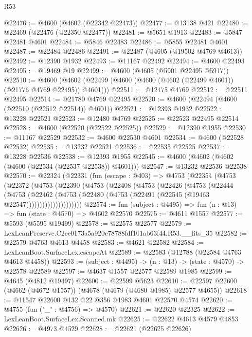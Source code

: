 \begin{lexlean}{R53}
\begin{coremodule}
@22476 := @4600 (@4602 (@22342 @22473))
@22477 := @13138 @421
@22480 := @22469 (@22476 (@22350 @22477))
@22481 := @5651 @1913
@22483 := @5847 @22481 @4601
@22484 := @5846 @22483
@22486 := @5855 @22481 @4601
@22487 := @22484 @22486
@22491 := @22487 (@4605 (@19502 @4769 @4613))
@22492 := @12390 @1932
@22493 := @11167 @22492
@22494 := @4600 @22493
@22495 := @19469 @19
@22499 := @4600 (@4605 (@5901 @22495 @5917))
@22510 := @4600 (@4602 (@22499 (@4600 (@4600 (@4602 (@22499 @4601)) (@21776 @4769 @22495)) @4601)))
@22511 := @12475 @4769
@22512 := @22511 @22495
@22514 := @21780 @4769 @22495
@22520 := @4600 (@22494 (@4600 (@22510 (@22512 @22514)) @4601))
@22521 := @12393 @1932
@22522 := @13228 @22521
@22523 := @12480 @4769
@22525 := @22523 @22495 @22514
@22528 := @4600 (@22520 (@22522 @22525))
@22529 := @12390 @1955
@22530 := @11167 @22529
@22532 := @4600 @22530 @4601
@22534 := @4600 (@22528 @22532)
@22535 := @13232 @22521
@22536 := @22535 @22525
@22537 := @13228 @22536
@22538 := @12393 @1955
@22545 := @4600 (@4602 (@4602 (@4600 (@22534 (@22537 @22538)) @4601)))
@22547 := @13232 @22536 @22538
@22570 := @22324
    (@22331
      (fun (escape : @403) =>
      @4753
        (@22354
          (@4753
            (@22372
              (@4753
                (@22390
                  (@4753
                    (@22408
                      (@4753
                        (@22426
                          (@4753
                            (@22444
                              (@4753
                                (@22462
                                  (@4753
                                    (@22480
                                      (@4753 (@22491 (@22545 (@19463 @22547)))))))))))))))))))))
@22574 := fun (subject : @4495) => fun (n : @13) => fun (state : @4570) => @4602 @22570
@22575 := @4611 @1557
@22577 := @5593 (@5595 @19499)
@22578 := @22575 @22577
@22579 := LexLeanPreserve.C2ee0173a5a920c78788fdf101ab63f44.R53.__fits_35
@22582 := @22579 @4763 @4613 @4458
@22583 := @4621 @22582
@22584 := LexLeanBoot.SurfaceLex.escapeAt
@22589 := @22583 (@12788 (@22584 @4763 @4613 @4458))
@22593 := (subject : @4495) -> (n : @13) -> (state : @4570) -> @22578 @22589
@22597 := @4637 @1557 @22577 @22589 @1985
@22599 := @4645 (@4812 @19497)
@22600 := @22599 @5623
@22610 := @22597 @22600 (@4662 (@4672 @1557)) (@4678 (@4679 (@4680 @1985) @22577 @4655))
@22618 := @11547 @22600 @132 @22 @356 @1983 @4601 @22570 @4574
@22620 := @4755 (fun ("_" : @4756) => @4570)
@22621 := @22620 @22325
@22622 := LexLeanBoot.SurfaceLex.Scanned.mk
@22625 := @22622 @4613 @4579 @4853
@22626 := @4973 @4529
@22628 := @22621 (@22625 @22626)

\end{coremodule}
\end{lexlean}

